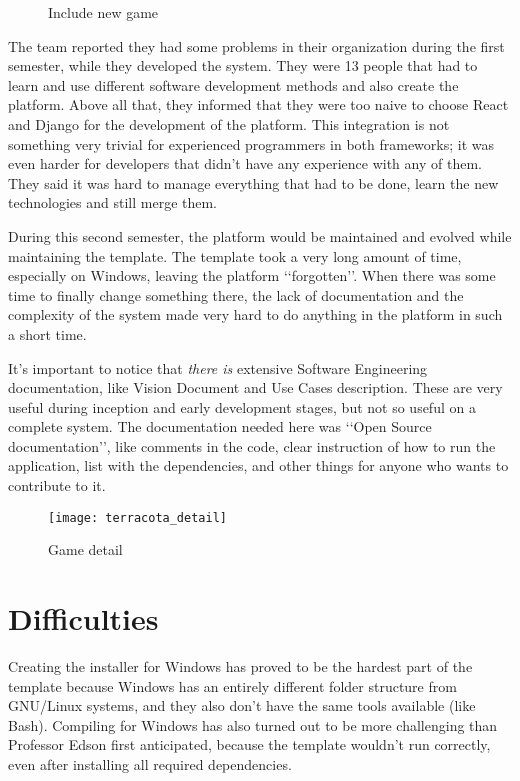 \begin{figure}[h!]
\centering
{}
\caption{Include new game}
\label {fig:include_game1}
\end{figure}

The team reported they had some problems in their organization during the first semester, while they developed the system. They were 13 people that had to learn and use different software development methods and also create the platform. Above all that, they informed that they were too naive to choose React and Django for the development of the platform. This integration is not something very trivial for experienced programmers in both frameworks; it was even harder for developers that didn't have any experience with any of them. They said it was hard to manage everything that had to be done, learn the new technologies and still merge them.


During this second semester, the platform would be maintained and evolved  while maintaining the template. The template took a very long amount of time, especially on Windows, leaving the platform \lq\lq forgotten\rq\rq{}. When there was some time to finally change something there, the lack of documentation and the complexity of the system made very hard to do anything in the platform in such a short time.

It's important to notice that \textit{there is} extensive Software Engineering documentation, like Vision Document and Use Cases description. These are very useful during inception and early development stages, but not so useful on a complete system. The documentation needed here was \lq\lq Open Source documentation\rq\rq{}, like comments in the code, clear instruction of how to run the application, list with the dependencies, and other things for anyone who wants to contribute to it.

\begin{figure}[h!]
\centering
\texttt{[image: terracota\_detail]}
\caption{Game detail}
\label {fig:game_detail}
\end{figure}

\section{Difficulties}
\label{sec:difficulties}

Creating the installer for Windows has proved to be the hardest part of the template because Windows has an entirely different folder structure from GNU/Linux systems, and they also don't have the same tools available (like Bash). Compiling for Windows has also turned out to be more challenging than Professor Edson first anticipated, because the template wouldn't run correctly, even after installing all required dependencies.

